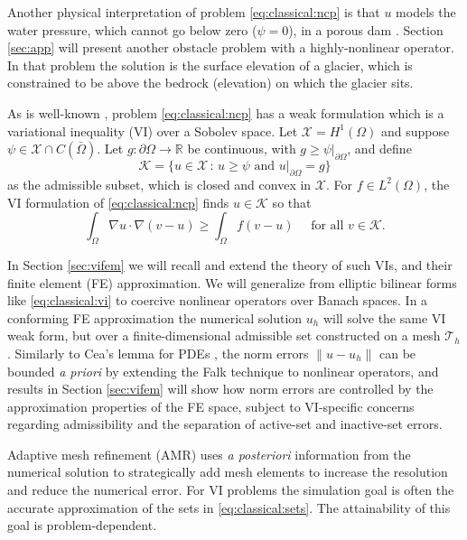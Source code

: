 \documentclass[]{interact}
\theoremstyle{plain}%
\theoremstyle{definition}
\theoremstyle{remark}
\newcommand{\RR}{\mathbb{R}}
\newcommand{\cK}{\mathcal{K}}
\newcommand{\cT}{\mathcal{T}}
\newcommand{\cX}{\mathcal{X}}
\begin{document}
Another physical interpretation of problem \eqref{eq:classical:ncp} is that $u$ models the water pressure, which cannot go below zero ($\psi=0$), in a porous dam \cite[for example]{AinsworthOdenLee1993}.  Section \ref{sec:app} will present another obstacle problem with a highly-nonlinear operator.  In that problem the solution is the surface elevation of a glacier, which is constrained to be above the bedrock (elevation) on which the glacier sits.

As is well-known \cite{KinderlehrerStampacchia1980}, problem \eqref{eq:classical:ncp} has a weak formulation which is a variational inequality (VI) over a Sobolev space.  Let $\cX=H^1(\Omega)$ \cite{ElmanSilvesterWathen2014} and suppose $\psi \in \cX \cap C(\bar\Omega)$.  Let $g:\partial \Omega\to \RR$ be continuous, with $g\ge\psi|_{\partial \Omega}$, and define
\begin{equation} \label{eq:classical:admissible}
\cK = \{u \in \cX \,:\, u \ge \psi \text{ and } u|_{\partial \Omega} = g\}
\end{equation}
as the admissible subset, which is closed and convex in $\cX$.  For $f\in L^2(\Omega)$, the VI formulation of \eqref{eq:classical:ncp} finds $u\in \cK$ so that
\begin{equation} \label{eq:classical:vi}
\int_\Omega \nabla u \cdot \nabla(v - u) \ge \int_\Omega f(v - u) \quad \text{ for all } v \in \cK.
\end{equation}

In Section \ref{sec:vifem} we will recall and extend the theory of such VIs, and their finite element (FE) approximation.  We will generalize from elliptic bilinear forms like \eqref{eq:classical:vi} to coercive nonlinear operators over Banach spaces.  In a conforming FE approximation the numerical solution $u_h$ will solve the same VI weak form, but over a finite-dimensional admissible set constructed on a mesh $\cT_h$.  Similarly to Cea's lemma for PDEs \cite{ElmanSilvesterWathen2014}, the norm errors $\|u-u_h\|$ can be bounded \emph{a priori} by extending the Falk \cite{Falk1974} technique to nonlinear operators, and results in Section \ref{sec:vifem} will show how norm errors are controlled by the approximation properties of the FE space, subject to VI-specific concerns regarding admissibility and the separation of active-set and inactive-set errors.

Adaptive mesh refinement (AMR) uses \emph{a posteriori} information from the numerical solution to strategically add mesh elements to increase the resolution and reduce the numerical error.  For VI problems the simulation goal is often the accurate approximation of the sets in \eqref{eq:classical:sets}.  The attainability of this goal is problem-dependent.
\end{document}
